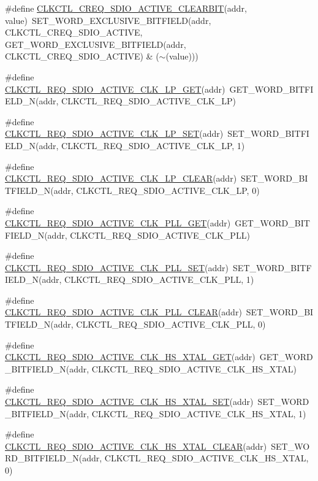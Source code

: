 \begin{DoxyCompactItemize}
\item 
\#define \hyperlink{a00544_aceec73cde8d63b97bef51a66490254cd}{CLKCTL\_\-CREQ\_\-SDIO\_\-ACTIVE\_\-CLEARBIT}(addr, value)~SET\_\-WORD\_\-EXCLUSIVE\_\-BITFIELD(addr, CLKCTL\_\-CREQ\_\-SDIO\_\-ACTIVE, GET\_\-WORD\_\-EXCLUSIVE\_\-BITFIELD(addr, CLKCTL\_\-CREQ\_\-SDIO\_\-ACTIVE) \& ($\sim$(value)))
\item 
\#define \hyperlink{a00544_a36b3773edf62dd8279e57d9072662e18}{CLKCTL\_\-REQ\_\-SDIO\_\-ACTIVE\_\-CLK\_\-LP\_\-GET}(addr)~GET\_\-WORD\_\-BITFIELD\_\-N(addr, CLKCTL\_\-REQ\_\-SDIO\_\-ACTIVE\_\-CLK\_\-LP)
\item 
\#define \hyperlink{a00544_a54a182f1d5300bcf2ba27e90a416abe4}{CLKCTL\_\-REQ\_\-SDIO\_\-ACTIVE\_\-CLK\_\-LP\_\-SET}(addr)~SET\_\-WORD\_\-BITFIELD\_\-N(addr, CLKCTL\_\-REQ\_\-SDIO\_\-ACTIVE\_\-CLK\_\-LP, 1)
\item 
\#define \hyperlink{a00544_a9a4567e3766be57a610d025094d0da7a}{CLKCTL\_\-REQ\_\-SDIO\_\-ACTIVE\_\-CLK\_\-LP\_\-CLEAR}(addr)~SET\_\-WORD\_\-BITFIELD\_\-N(addr, CLKCTL\_\-REQ\_\-SDIO\_\-ACTIVE\_\-CLK\_\-LP, 0)
\item 
\#define \hyperlink{a00544_ab1e810e6a112e54364697e51359670e9}{CLKCTL\_\-REQ\_\-SDIO\_\-ACTIVE\_\-CLK\_\-PLL\_\-GET}(addr)~GET\_\-WORD\_\-BITFIELD\_\-N(addr, CLKCTL\_\-REQ\_\-SDIO\_\-ACTIVE\_\-CLK\_\-PLL)
\item 
\#define \hyperlink{a00544_adba87b56335e8a93907f1defd800db2c}{CLKCTL\_\-REQ\_\-SDIO\_\-ACTIVE\_\-CLK\_\-PLL\_\-SET}(addr)~SET\_\-WORD\_\-BITFIELD\_\-N(addr, CLKCTL\_\-REQ\_\-SDIO\_\-ACTIVE\_\-CLK\_\-PLL, 1)
\item 
\#define \hyperlink{a00544_a700dfc9a5e083f58b1f47ac61cdba88b}{CLKCTL\_\-REQ\_\-SDIO\_\-ACTIVE\_\-CLK\_\-PLL\_\-CLEAR}(addr)~SET\_\-WORD\_\-BITFIELD\_\-N(addr, CLKCTL\_\-REQ\_\-SDIO\_\-ACTIVE\_\-CLK\_\-PLL, 0)
\item 
\#define \hyperlink{a00544_ac14cb8ea76d5cab596fe4ff81674e6ec}{CLKCTL\_\-REQ\_\-SDIO\_\-ACTIVE\_\-CLK\_\-HS\_\-XTAL\_\-GET}(addr)~GET\_\-WORD\_\-BITFIELD\_\-N(addr, CLKCTL\_\-REQ\_\-SDIO\_\-ACTIVE\_\-CLK\_\-HS\_\-XTAL)
\item 
\#define \hyperlink{a00544_a51439debe58331dbfcb90f2fbf4a8fc8}{CLKCTL\_\-REQ\_\-SDIO\_\-ACTIVE\_\-CLK\_\-HS\_\-XTAL\_\-SET}(addr)~SET\_\-WORD\_\-BITFIELD\_\-N(addr, CLKCTL\_\-REQ\_\-SDIO\_\-ACTIVE\_\-CLK\_\-HS\_\-XTAL, 1)
\item 
\#define \hyperlink{a00544_a23ff36a71d098faa6019525d93c1e7c1}{CLKCTL\_\-REQ\_\-SDIO\_\-ACTIVE\_\-CLK\_\-HS\_\-XTAL\_\-CLEAR}(addr)~SET\_\-WORD\_\-BITFIELD\_\-N(addr, CLKCTL\_\-REQ\_\-SDIO\_\-ACTIVE\_\-CLK\_\-HS\_\-XTAL, 0)

\end{DoxyCompactItemize}
